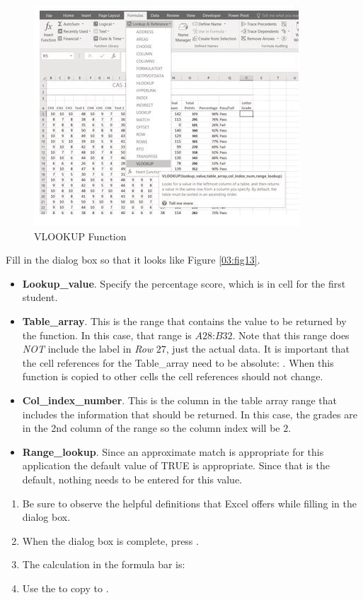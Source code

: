 \begin{figure}[H]
	\centering
	\includegraphics[width=\maxwidth{.95\linewidth}]{gfx/ch03_fig12}
	\caption{VLOOKUP Function}
	\label{03:fig12}
\end{figure}

Fill in the dialog box so that it looks like Figure \ref{03:fig13}.

\begin{itemize}
	\item \textbf{Lookup\_value}. Specify the percentage score, which is in cell  for the first student.
	\item \textbf{Table\_array}. This is the range that contains the value to be returned by the function. In this case, that range is $ A28 $:$ B32 $. Note that this range does \textit{NOT} include the label in \textit{Row} $ 27 $, just the actual data. It is important that the cell references for the Table\_array need to be absolute: . When this function is copied to other cells the cell references should not change.
	\item \textbf{Col\_index\_number}. This is the column in the table array range that includes the information that should be returned. In this case, the grades are in the 2nd column of the range so the column index will be $ 2 $.
	\item \textbf{Range\_lookup}. Since an approximate match is appropriate for this application the default value of TRUE is appropriate. Since that is the default, nothing needs to be entered for this value. 
\end{itemize}

\begin{enumerate}[resume]
	\item Be sure to observe the helpful definitions that Excel offers while filling in the  dialog box.
	\item When the dialog box is complete, press .
	\item The calculation in the formula bar is: 
	\item Use the  to copy  to .
\end{enumerate}

